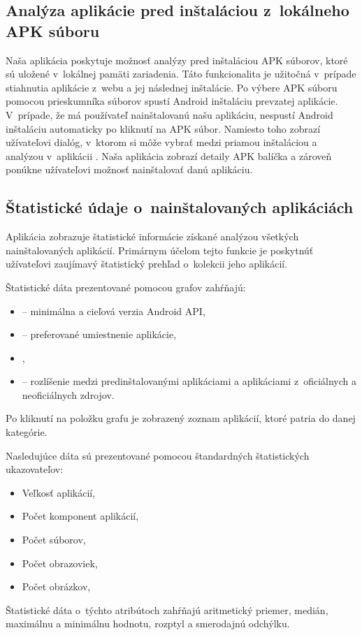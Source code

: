 \subsection{Analýza aplikácie pred inštaláciou z~lokálneho APK súboru}
Naša aplikácia poskytuje možnosť analýzy pred inštaláciou APK súborov, ktoré sú uložené v~lokálnej pamäti zariadenia. Táto funkcionalita je užitočná v~prípade stiahnutia aplikácie z~webu a jej následnej inštalácie. Po výbere APK súboru pomocou prieskumníka súborov spustí Android inštaláciu prevzatej aplikácie. V~prípade, že má používateľ nainštalovanú našu aplikáciu, nespustí Android inštaláciu automaticky po kliknutí na APK súbor. Namiesto toho zobrazí užívateľovi dialóg, v~ktorom si môže vybrať medzi priamou inštaláciou a analýzou v~aplikácii . Naša aplikácia zobrazí detaily APK balíčka a zároveň ponúkne užívateľovi možnosť nainštalovať danú aplikáciu.

\subsection{Štatistické údaje o~nainštalovaných aplikáciách}
Aplikácia zobrazuje štatistické informácie získané analýzou všetkých nainštalovaných aplikácií. Primárnym účelom tejto funkcie je poskytnúť užívateľovi zaujímavý štatistický prehľad o~kolekcii jeho aplikácií. 

\noindent Štatistické dáta prezentované pomocou grafov zahŕňajú:
\begin{itemize}
	\item {} -- minimálna a cieľová verzia Android API,
	\item {} -- preferované umiestnenie aplikácie,
	\item {},
	\item {} -- rozlíšenie medzi predinštalovanými aplikáciami a aplikáciami z~oficiálnych a neoficiálnych zdrojov.
\end{itemize}

\noindent Po kliknutí na položku grafu je zobrazený zoznam aplikácií, ktoré patria do danej kategórie.

\noindent Nasledujúce dáta sú prezentované pomocou štandardných štatistických ukazovateľov:
\begin{itemize}
	\item Veľkosť aplikácií,
	\item Počet komponent aplikácií,
	\item Počet súborov,
	\item Počet obrazoviek,
	\item Počet obrázkov,
\end{itemize}
Štatistické dáta o~týchto atribútoch zahŕňajú aritmetický priemer, medián, maximálnu a minimálnu hodnotu, rozptyl a smerodajnú odchýlku. 


